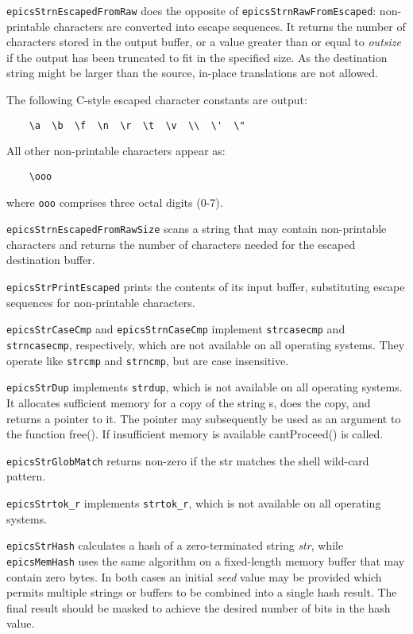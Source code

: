 \verb|epicsStrnEscapedFromRaw| does the opposite of \verb|epicsStrnRawFromEscaped|: non-printable characters are 
converted into escape sequences. It returns the number of characters stored in the output buffer, or a value greater than or 
equal to \emph{outsize} if the output has been truncated to fit in the specified size. As the destination string might be larger than 
the source, in-place translations are not allowed.

The following C-style escaped character constants are output:

\begin{verbatim}
    \a  \b  \f  \n  \r  \t  \v  \\  \'  \"
\end{verbatim}

All other non-printable characters appear as:

\begin{verbatim}
    \ooo
\end{verbatim}

where \verb|ooo| comprises three octal digits (0-7).  

\verb|epicsStrnEscapedFromRawSize| scans a string that may contain non-printable characters and returns the number of 
characters needed for the escaped destination buffer.

\verb|epicsStrPrintEscaped| prints the contents of its input buffer, substituting escape sequences for non-printable 
characters.

\verb|epicsStrCaseCmp| and \verb|epicsStrnCaseCmp| implement \verb|strcasecmp| and \verb|strncasecmp|, respectively, which 
are not available on all operating systems. They operate like \verb|strcmp| and \verb|strncmp|, but are case insensitive.

\verb|epicsStrDup| implements \verb|strdup|, which is not available on all operating systems.  It allocates sufficient memory for 
a copy of the string s, does the copy, and returns a pointer to it.  The pointer may subsequently be used as an argument to 
the function free().  If insufficient memory is available cantProceed() is called.

\verb|epicsStrGlobMatch| returns non-zero if the str matches the shell wild-card pattern.

\verb|epicsStrtok_r| implements \verb|strtok_r|, which is not available on all operating systems.

\verb|epicsStrHash| calculates a hash of a zero-terminated string \emph{str}, while \verb|epicsMemHash| uses the same algorithm on a 
fixed-length memory buffer that may contain zero bytes. In both cases an initial \emph{seed} value may be provided which 
permits multiple strings or buffers to be combined into a single hash result. The final result should be masked to achieve 
the desired number of bits in the hash value.

